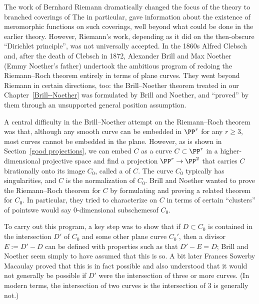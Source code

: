 The work of Bernhard Riemann dramatically changed the focus of the
%
theory to branched coverings of   
The 
%
in particular, gave
information about the existence of meromorphic functions on such
coverings, well beyond what could be done in the earlier theory.
However, Riemann's work, depending as it did on the then-obscure
%
``Dirichlet principle'', was not universally accepted. In the 1860s
%
%
%
Alfred Clebsch and, after the death of Clebsch  in 1872, Alexander
Brill and Max Noether (Emmy Noether's father) undertook the ambitious
program of redoing the Riemann--Roch theorem entirely in terms of
plane curves. They went beyond Riemann in certain directions, too: the
Brill--Noether theorem treated in our Chapter~\ref{Brill--Noether} was
formulated by Brill and Noether, and ``proved'' by them through an
unsupported general position assumption.

A central difficulty in the Brill--Noether attempt on the Riemann--Roch theorem was that,
although any smooth curve can be embedded in $\PP^r$ for any $r \geq 3$, most curves cannot be embedded in the plane. 
However, as is shown in Section~\ref{good projections}, we can embed
$C$ as a curve $ C \subset \PP^r$ in a higher-dimensional projective
space and find a projection $\PP^r \to \PP^2$ that carries $C$
birationally onto its image $C_0$, called a 
%
of $C$. The
curve $C_0$ typically has singularities, and $C$ is the normalization
of $C_0$. Brill and Noether wanted to prove the Riemann--Roch theorem
for $C$ by formulating and proving a related theorem for $C_0$. In
particular, they tried to characterize 
%
%
on $C$ in terms of certain ``clusters'' of points\emdash we would say
0-dimensional subschemes\emdash of $C_0$.  

To carry out this program, a key step was to show that if $D\subset C_0$ is contained in the intersection
$D'$ of $C_0$ and some other plane curve $C_0'$, then a divisor 
$E := D'-D$ can be defined with properties such as that $D'-E = D$;
Brill and Noether seem simply to have assumed that this is so. A bit
%
later Frances Sowerby Macaulay proved that this is in fact possible
and also understood that it would not generally be possible if $D'$
were the intersection of three or more curves.
(In modern terms, the intersection of two curves is 
%
the intersection of 3 is generally not.)

